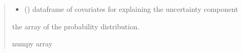 \documentclass[letterpaper,10pt,english]{sphinxmanual}
\begin{document}
\begin{fulllineitems}
\begin{quote}
\begin{description}
\begin{itemize}
\item {} 
\sphinxAtStartPar
{} () \textendash{} dataframe of covariates for explaining the uncertainty component

\end{itemize}

\sphinxAtStartPar
the array of the probability distribution.

\sphinxAtStartPar
numpy array

\end{description}\end{quote}

\end{fulllineitems}

\end{document}

